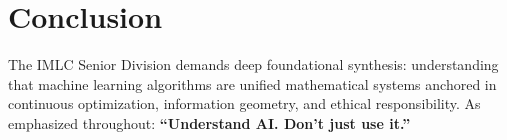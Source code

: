 \documentclass[11pt,a4paper]{article}
\theoremstyle{definition}
\theoremstyle{plain}
\theoremstyle{remark}
\begin{document}
\section*{Conclusion}
The IMLC Senior Division demands deep foundational synthesis: understanding that machine learning algorithms are unified mathematical systems anchored in continuous optimization, information geometry, and ethical responsibility. As emphasized throughout: \textbf{``Understand AI. Don't just use it.''}



\end{document}
